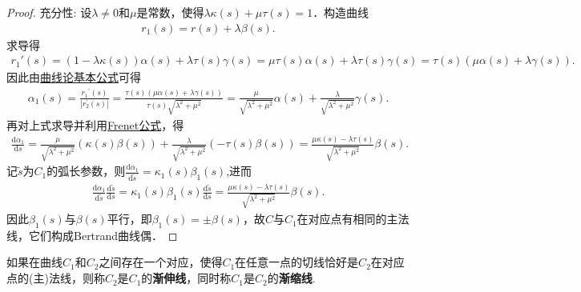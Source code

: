 \documentclass[../../main.tex]{subfiles}%
\begin{document}
\begin{proof}
{\heiti 充分性:} 设$\lambda\neq0$和$\mu$是常数，使得$\lambda\kappa(s)+\mu\tau(s)=1$．构造曲线
\begin{align}
r_1(s)=r(s)+\lambda\beta(s).
\end{align}
求导得
\begin{align*}
r_1' \left( s \right) =(1-\lambda \kappa \left( s \right) )\alpha \left( s \right) +\lambda \tau \left( s \right) \gamma \left( s \right) =\mu \tau \left( s \right) \alpha \left( s \right) +\lambda \tau \left( s \right) \gamma \left( s \right) =\tau \left( s \right) (\mu \alpha \left( s \right) +\lambda \gamma \left( s \right) ).
\end{align*}
因此由\hyperref[theorem:曲线论基本公式]{曲线论基本公式}可得
\begin{align*}
\alpha _1(s)=\frac{{r_1}^{\prime}\left( s \right)}{\left| r_{2}^{\prime}\left( s \right) \right|}=\frac{\tau \left( s \right) \left( \mu \alpha \left( s \right) +\lambda \gamma \left( s \right) \right)}{\tau \left( s \right) \sqrt{\lambda ^2+\mu ^2}}=\frac{\mu}{\sqrt{\lambda ^2+\mu ^2}}\alpha (s)+\frac{\lambda}{\sqrt{\lambda ^2+\mu ^2}}\gamma (s).
\end{align*}
再对上式求导并利用\hyperref[theorem:微分几何-Frenet公式]{Frenet公式}，得
\begin{align*}
\frac{\mathrm{d}\alpha _1}{\mathrm{d}s}=\frac{\mu}{\sqrt{\lambda ^2+\mu ^2}}(\kappa \left( s \right) \beta \left( s \right) )+\frac{\lambda}{\sqrt{\lambda ^2+\mu ^2}}(-\tau \left( s \right) \beta \left( s \right) )=\frac{\mu \kappa \left( s \right) -\lambda \tau \left( s \right)}{\sqrt{\lambda ^2+\mu ^2}}\beta \left( s \right) .
\end{align*}
记$\tilde{s}$为$C_1$的弧长参数，则$\frac{\mathrm{d}\alpha _1}{\mathrm{d}\tilde{s}}=\kappa _1\left( s \right) \beta _1\left( s \right) $,进而
\begin{align*}
\frac{\mathrm{d}\alpha _1}{\mathrm{d}\tilde{s}}\frac{\mathrm{d}\tilde{s}}{\mathrm{d}s}=\kappa _1\left( s \right) \beta _1\left( s \right) \frac{\mathrm{d}\tilde{s}}{\mathrm{d}s}=\frac{\mu \kappa \left( s \right) -\lambda \tau \left( s \right)}{\sqrt{\lambda ^2+\mu ^2}}\beta \left( s \right) .
\end{align*}
因此$\beta_1(s)$与$\beta(s)$平行，即$\beta_1(s)=\pm\beta(s)$，故$C$与$C_1$在对应点有相同的主法线，它们构成Bertrand曲线偶．
\end{proof}

\begin{definition}
如果在曲线$C_1$和$C_2$之间存在一个对应，使得$C_1$在任意一点的切线恰好是$C_2$在对应点的(主)法线，则称$C_2$是$C_1$的\textbf{渐伸线}，同时称$C_1$是$C_2$的\textbf{渐缩线}.
\end{definition}
\end{document}
